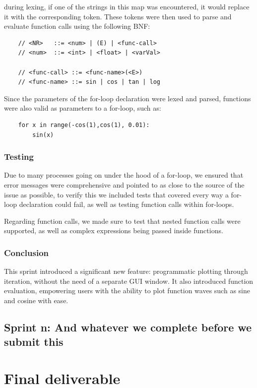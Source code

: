 \documentclass[a4paper, oneside, 11pt]{report}
\begin{document}
during lexing, if one of the strings in this map was encountered, it would replace it with the corresponding token. These tokens were then used to parse and evaluate function calls using the following BNF:

\begin{verbatim}
    // <NR>   ::= <num> | (E) | <func-call>
    // <num>  ::= <int> | <float> | <varVal>

    // <func-call> ::= <func-name>(<E>)
    // <func-name> ::= sin | cos | tan | log
\end{verbatim}

Since the parameters of the for-loop declaration were lexed and parsed, functions were also valid as parameters to a for-loop, such as:

\begin{verbatim}
    for x in range(-cos(1),cos(1), 0.01): 
        sin(x)
\end{verbatim}

\subsection{Testing}
Due to many processes going on under the hood of a for-loop, we ensured that error messages were comprehensive and pointed to as close to the source of the issue as possible, to verify this we included tests that covered every way a for-loop declaration could fail, as well as testing function calls within for-loops.

Regarding function calls, we made sure to test that nested function calls were supported, as well as complex expressions being passed inside functions.

\subsection{Conclusion}
This sprint introduced a significant new feature: programmatic plotting through iteration, without the need of a separate GUI window. It also introduced function evaluation, empowering users with the ability to plot function waves such as sine and cosine with ease.

\section{Sprint n: And whatever we complete before we submit this}



\chapter{Final deliverable}\label{Impl}
\end{document}
